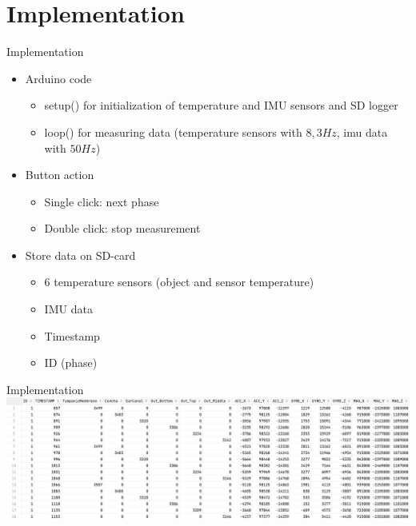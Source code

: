 \documentclass[en]{sdqbeamer}
\begin{document}
\section{Implementation}

\begin{frame}{Implementation}
    \begin{itemize}
        \item Arduino code
        \begin{itemize}
            \item setup() for initialization of temperature and IMU sensors and SD logger
            \item loop() for measuring data (temperature sensors with $8,3Hz$, imu data with $50Hz$)
        \end{itemize}
        \item Button action
        \begin{itemize}
            \item Single click: next phase
            \item Double click: stop measurement
        \end{itemize}
        \item Store data on SD-card
        \begin{itemize}
            \item 6 temperature sensors (object and sensor temperature)
            \item IMU data
            \item Timestamp
            \item ID (phase)
        \end{itemize}
    \end{itemize}
\end{frame}

\begin{frame}{Implementation}
    \includegraphics[width=\linewidth]{../thesis-doc/images/prototype/MeasurementRawDataSnippet_short.png}
\end{frame}

\backupend
\end{document}
